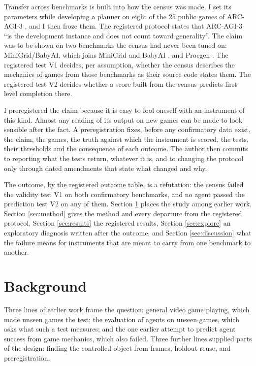 \documentclass[twocolumn]{svjour3}
\begin{document}
Transfer across benchmarks is built into how the census was made. I set
its parameters while developing a planner on eight of the 25 public
games of ARC-AGI-3 \citep{arcprize2026arcagi3}, and I then froze them.
The registered protocol states that ARC-AGI-3 ``is the development
instance and does not count toward generality''. The claim was to be
shown on two benchmarks the census had never been tuned on:
MiniGrid/BabyAI, which joins MiniGrid
\citep{chevalierboisvert2023minigrid} and BabyAI
\citep{chevalierboisvert2019babyai}, and Procgen
\citep{cobbe2020procgen}. The registered test V1 decides, per
assumption, whether the census describes the mechanics of games from
those benchmarks as their source code states them. The registered test
V2 decides whether a score built from the census predicts first-level
completion there.

I preregistered the claim because it is easy to fool oneself with an
instrument of this kind. Almost any reading of its output on new games
can be made to look sensible after the fact. A preregistration fixes,
before any confirmatory data exist, the claim, the games, the truth
against which the instrument is scored, the tests, their thresholds and
the consequence of each outcome. The author then commits to reporting
what the tests return, whatever it is, and to changing the protocol only
through dated amendments that state what changed and why.

The outcome, by the registered outcome table, is a refutation: the
census failed the validity test V1 on both confirmatory benchmarks, and
no agent passed the prediction test V2 on any of them. Section
\ref{sec:background} places the study among earlier work, Section
\ref{sec:method} gives the method and every departure from the
registered protocol, Section \ref{sec:results} the registered results,
Section \ref{sec:explore} an exploratory diagnosis written after the
outcome, and Section \ref{sec:discussion} what the failure means for
instruments that are meant to carry from one benchmark to another.

\section{Background}\label{sec:background}

Three lines of earlier work frame the question: general video game
playing, which made unseen games the test; the evaluation of agents on
unseen games, which asks what such a test measures; and the one earlier
attempt to predict agent success from game mechanics, which also failed.
Three further lines supplied parts of the design: finding the controlled
object from frames, holdout reuse, and preregistration.
\end{document}
